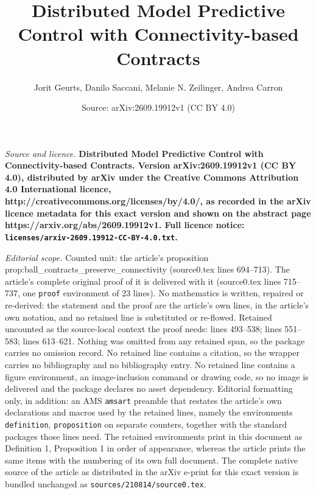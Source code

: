 \documentclass[10pt,a4paper]{amsart}
\title{\LARGE \bf Distributed Model Predictive Control with Connectivity-based Contracts}
\author{Jorit Geurts, Danilo Saccani, Melanie N. Zeilinger, Andrea Carron}
\date{Source: arXiv:2609.19912v1 (CC BY 4.0)}
\begin{document}
\maketitle

\noindent\emph{Source and licence.} \LARGE \bf Distributed Model Predictive Control with Connectivity-based Contracts. Version arXiv:2609.19912v1 (CC BY 4.0), distributed by arXiv under the Creative Commons Attribution 4.0 International licence, http://creativecommons.org/licenses/by/4.0/, as recorded in the arXiv licence metadata for this exact version and shown on the abstract page https://arxiv.org/abs/2609.19912v1. Full licence notice: \texttt{licenses/arxiv-2609.19912-CC-BY-4.0.txt}.\par\smallskip

\noindent\textit{Editorial scope.} Counted unit: the article's proposition prop:ball\_contracts\_preserve\_connectivity (source0.tex lines 694--713). The article's complete original proof of it is delivered with it (source0.tex lines 715--737, one \texttt{proof} environment of 23 lines). No mathematics is written, repaired or re-derived: the statement and the proof are the article's own lines, in the article's own notation, and no retained line is substituted or re-flowed.  Retained uncounted as the source-local context the proof needs: lines 493--538; lines 551--583; lines 613--621.  Nothing was omitted from any retained span, so the package carries no omission record.  No retained line contains a citation, so the wrapper carries no bibliography and no bibliography entry.  No retained line contains a figure environment, an image-inclusion command or drawing code, so no image is delivered and the package declares no asset dependency.  Editorial formatting only, in addition: an AMS \texttt{amsart} preamble that restates the article's own declarations and macros used by the retained lines, namely the environments \texttt{definition}, \texttt{proposition} on separate counters, together with the standard packages those lines need.  The retained environments print in this document as Definition 1, Proposition 1 in order of appearance, whereas the article prints the same items with the numbering of its own full document.  The complete native source of the article as distributed in the arXiv e-print for this exact version is bundled unchanged as \texttt{sources/210814/source0.tex}.
\end{document}
